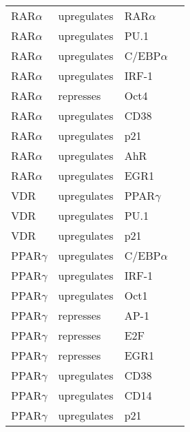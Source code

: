 

\begin{center}
\renewcommand{\arraystretch}{0.8}
\label{Leukemia_TF_Network}
\begin{scriptsize}
\begin{supertabular}{|p{3cm}|p{3cm}|p{3cm}|p{3cm}|}  
\hline											
RAR$\alpha$ &  upregulates & RAR$\alpha$ & \cite{Rishi1996} \\
RAR$\alpha$ &  upregulates & PU.1 & \cite{Mueller2006}\\
RAR$\alpha$ &  upregulates & C/EBP$\alpha$ & \cite{Friedman2007}\\
RAR$\alpha$ &  upregulates & IRF-1 & \cite{Luo2006}\\
RAR$\alpha$ &  represses & Oct4 & \cite{Sylvester1994}\\
RAR$\alpha$ &  upregulates & CD38 & \cite{Drach1994}\\
RAR$\alpha$ &  upregulates & p21 & \cite{Liu1996}\\
RAR$\alpha$ &  upregulates & AhR & \cite{Bunaciu2013}\\
RAR$\alpha$ &  upregulates & EGR1 & \cite{Balmer2002}\\
VDR &  upregulates & PPAR$\gamma$ & \cite{Dunlop2005}\\
VDR &  upregulates & PU.1 & \\
VDR &  upregulates & p21 & \cite{Liu1996a}\\
PPAR$\gamma$ &  upregulates & C/EBP$\alpha$ & \cite{Rosen2002}\\
PPAR$\gamma$ &  upregulates & IRF-1 & \cite{Varley2009}\\
PPAR$\gamma$ &  upregulates & Oct1 & \cite{Bruemmer2003}\\
PPAR$\gamma$ &  represses & AP-1 & \cite{Delerive1999}\\
PPAR$\gamma$ &  represses & E2F & \cite{Altiok1997}\\
PPAR$\gamma$ &  represses & EGR1 & \cite{Fei2011}\\
PPAR$\gamma$ &  upregulates & CD38 & \cite{Song2012}\\
PPAR$\gamma$ &  upregulates & CD14 & \cite{Szanto2005}\\
PPAR$\gamma$ &  upregulates & p21 & \cite{Han2004}\\

\end{supertabular}
\end{scriptsize}
\end{center}
